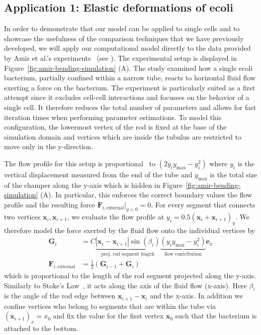\documentclass[10pt,letterpaper]{article}
\renewcommand{\vec}[1]{\mathbf{#1}}
\begin{document}
\subsection{Application 1: Elastic deformations of \acl{ecoli}}
\label{sec:application-1-amir}
In order to demonstrate that our model can be applied to single cells and to showcase the usefulness
of the comparison techniques that we have previously developed, we will apply our computational
model directly to the data provided by Amir et al.'s experiments~\cite{Amir2014,Amir2014_2} (see
).
The experimental setup is displayed in Figure~\ref{fig:amir-bending-simulation} (A).
The study examined how a single \ac{ecoli} bacterium, partially confined within a narrow tube,
reacts to horizontal fluid flow exerting a force on the bacterium.
The experiment is particularly suited as a first attempt since it excludes cell-cell interactions
and focusses on the behavior of a single cell.
It therefore reduces the total number of parameters and allows for fast iteration times when
performing parameter estimations. To model this configuration, the lowermost vertex of the rod is
fixed at the base of the simulation
domain and vertices which are inside the tubulus are restricted to move only in the y-direction.

The flow profile for this setup is proportional~\cite{Wolschin2021} to $(2y_iy_\text{max}-y_i^2)$
where $y_i$ is the vertical displacement measured from the end of the tube and $y_\text{max}$
is the total size of the champer along the y-axis which is hidden in
Figure~\ref{fig:amir-bending-simulation} (A).
In particular, this enforces the correct boundary values the flow profile and the resulting force
$\vec{F}_{i,\text{external}}|_{y=0}=0$.
For every segment that connects two vertices $\vec{x}_i,\vec{x}_{i+1}$, we evaluate the flow profile
at $y_i=0.5(\vec{x}_i+\vec{x}_{i+1})_y$.
We therefore model the force exerted by the fluid flow onto the individual vertices by
\begin{align}
    \vec{G}_i &= C
    \underbrace{|\vec{x}_i - \vec{x}_{i+1}|\sin(\beta_i)}_\text{proj. rod segment length}
    \underbrace{(y_iy_\text{max} - y_i^2)}_\text{flow contribution}\vec{e}_x\\
    \vec{F}_{i,\text{external}} &= \frac{1}{2}(\vec{G}_{i-1}+\vec{G}_i)
\end{align}
which is proportional to the length of the rod segment projected along the y-axis.
Similarly to Stoke's Law~\cite{Stokes1856}, it acts along the axis of the fluid flow (x-axis).
Here $\beta_i$ is the angle of the rod edge between $\vec{x}_{i+1}-\vec{x}_i$ and the x-axis.
In addition we confine vertices who belong to segments that are within the tube
via $(\vec{x}_{i+1})_x=x_0$ and fix the value for the first vertex
$\vec{x}_0$ such that the bacterium is attached to the bottom.
\end{document}

